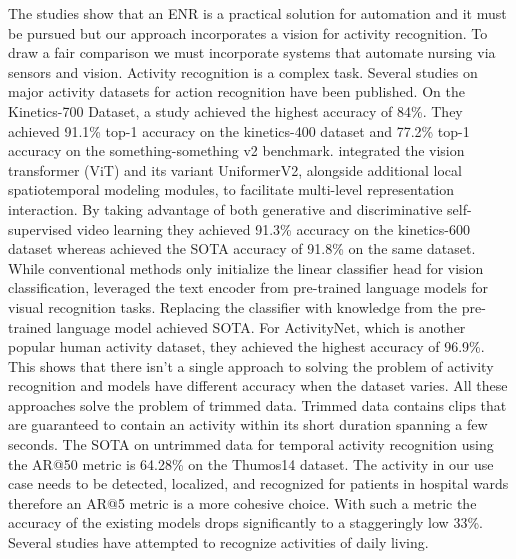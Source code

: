 The studies show that an ENR is a practical solution for automation and it must be pursued but our approach incorporates a vision for activity recognition. To draw a fair comparison we must incorporate systems that automate nursing via sensors and vision. Activity recognition is a complex task. Several studies on major activity datasets for action recognition have been published. On the Kinetics-700 Dataset, a study \cite{InternVideo} achieved the highest accuracy of 84\%. They achieved 91.1\% top-1 accuracy on the kinetics-400 dataset and 77.2\% top-1 accuracy on the something-something v2 benchmark. \cite{ViT} integrated the vision transformer (ViT) and its variant UniformerV2, alongside additional local spatiotemporal modeling modules, to facilitate multi-level representation interaction. By taking advantage of both generative and discriminative self-supervised video learning they achieved 91.3\% accuracy on the kinetics-600 dataset whereas \cite{TubeViT-H} achieved the SOTA accuracy of 91.8\% on the same dataset. While conventional methods only initialize the linear classifier head for vision classification, \cite{ViT} leveraged the text encoder from pre-trained language models for visual recognition tasks. Replacing the classifier with knowledge from the pre-trained language model achieved SOTA. For ActivityNet, which is another popular human activity dataset, they achieved the highest accuracy of 96.9\%. This shows that there isn't a single approach to solving the problem of activity recognition and models have different accuracy when the dataset varies. All these approaches solve the problem of trimmed data. Trimmed data contains clips that are guaranteed to contain an activity within its short duration spanning a few seconds. The SOTA on untrimmed data for temporal activity recognition using the AR@50 metric is 64.28\% on the Thumos14 dataset. The activity in our use case needs to be detected, localized, and recognized for patients in hospital wards therefore an AR@5 metric is a more cohesive choice. With such a metric the accuracy of the existing models drops significantly to a staggeringly low 33\%. Several studies have attempted to recognize activities of daily living.
